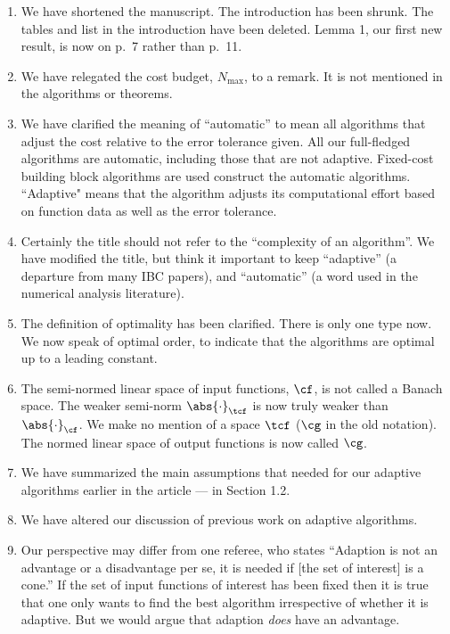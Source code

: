 \documentclass[11pt]{article}
\newcommand{\Fnorm}[1]{\abs{#1}_{\cf}}
\newcommand{\Ftnorm}[1]{\abs{#1}_{\tcf}}
\begin{document}
\begin{enumerate}
\renewcommand{\labelenumi}{\arabic{enumi}.}

\item We have shortened the manuscript.  The introduction has been shrunk. The tables and list in the introduction have been deleted.  Lemma 1, our first new result, is now on p.\ 7 rather than p.\ 11.  

\item We have relegated the cost budget, $N_{\max}$, to a remark.  It is not mentioned in the algorithms or theorems.

\item We have clarified the meaning of ``automatic'' to mean all algorithms that adjust the cost relative to the error tolerance given.  All our full-fledged algorithms are automatic, including those that are not adaptive.  Fixed-cost building block algorithms are used construct the automatic algorithms.  ``Adaptive" means that the algorithm adjusts its computational effort based on function data as well as the error tolerance.

\item Certainly the title should not refer to the ``complexity of an algorithm''.  We have modified the title, but think it important to keep ``adaptive'' (a departure from many IBC papers), and ``automatic'' (a word used in the numerical analysis literature).

\item The definition of optimality has been clarified.  There is only one type now.  We now speak of optimal order, to indicate that the algorithms are optimal up to a leading constant.

\item The semi-normed linear space of input functions, $\cf$, is not called a Banach space.  The weaker semi-norm $\Ftnorm{\cdot}$ is now truly weaker than $\Fnorm{\cdot}$.  We make no mention of a space $\tcf$ ($\cg$ in the old notation).  The normed linear space of output functions is now called $\cg$.

\item We have summarized the main assumptions that needed for our adaptive algorithms earlier in the article --- in Section 1.2.

\item We have altered our discussion of previous work on adaptive algorithms.

\item Our perspective may differ from one referee, who states ``Adaption is not an advantage or a disadvantage per se, it is needed if [the set of interest] is a cone.'' If the set of input functions of interest has been fixed then it is true that one only wants to find the best algorithm irrespective of whether it is adaptive.  But we would argue that adaption \emph{does} have an advantage.


\end{enumerate}
\end{document}
